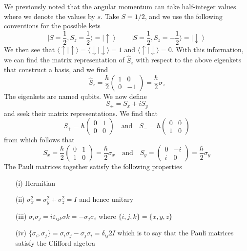 \begin{defi}
We previously noted that the angular momentum can take half-integer values where we denote the values by $s$. Take $S=1/2$, and we use the following conventions for the possible kets
\[\Big|S=\dfrac{1}{2},S_{z}=\dfrac{1}{2}\Big\rangle =\left|\uparrow \right\rangle\qquad \Big|S=\dfrac{1}{2},S_{z}=-\dfrac{1}{2}\Big\rangle =\left|\downarrow\right\rangle \]
We then see that $\langle \uparrow |\uparrow \rangle =\langle  \downarrow |\downarrow \rangle =1$ and $\langle \uparrow |\downarrow\rangle=0$. With this information, we can find the matrix representation of $\hat{S}_{z}$ with respect to the above eigenkets that construct a basis, and we find
\[\hat{S}_{z}=\dfrac{\hbar }{2}\begin{pmatrix}
1&0\\0&{-1}
\end{pmatrix}=\dfrac{\hbar }{2}\sigma _{z}
\]
The eigenkets are named qubits. We now define
\[S_{\pm}=S_{x}\pm iS_{y} \]
and seek their matrix representations. We find that
\[S_{+}=\hbar \begin{pmatrix}
0&1\\0&0
\end{pmatrix}\quad \mathrm{and} \quad S_{-}=\hbar \begin{pmatrix}
0&0\\
1&0
\end{pmatrix}
\]
from which follows that
\[S_{x}=\dfrac{\hbar }{2}\begin{pmatrix}
0&1\\1&0
\end{pmatrix}=\dfrac{\hbar }{2}\sigma _{x}\quad \mathrm{and}\quad S_{y}=
\begin{pmatrix}
0&-i\\
i&0
\end{pmatrix}=\dfrac{\hbar }{2}\sigma _{y}
\]
The Pauli matrices together satisfy the following properties
\begin{itemize}
\item[(i)] Hermitian
\item[(ii)] $\sigma _{x}^2=\sigma _{y}^2+\sigma _{z}^2=I$ and hence unitary
\item[(iii)] $\sigma _{i}\sigma _{j}=i\varepsilon _{ijk}\sigma k=-\sigma _{j}\sigma _{i}$ where $\{i,j,k\}=\{x,y,z\}$
\item[(iv)] $\{\sigma _{i},\sigma _{j}\}= \sigma_{i}\sigma _{j}-\sigma_{j}\sigma _{i}=\delta _{ij}2I $ which is to say that the Pauli matrices satisfy the Clifford algebra
\end{itemize}
\end{defi}
\vspace{2ex}

